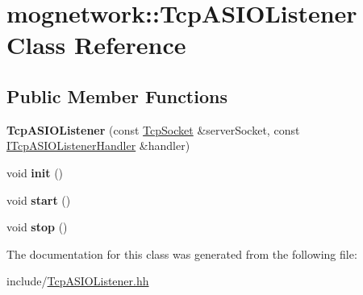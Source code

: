 \hypertarget{classmognetwork_1_1_tcp_a_s_i_o_listener}{\section{mognetwork\-:\-:Tcp\-A\-S\-I\-O\-Listener Class Reference}
\label{classmognetwork_1_1_tcp_a_s_i_o_listener}
}
\subsection*{Public Member Functions}
\begin{DoxyCompactItemize}
\item 
\hypertarget{classmognetwork_1_1_tcp_a_s_i_o_listener_a38db3f457487664499904641b214176c}{{\bfseries Tcp\-A\-S\-I\-O\-Listener} (const \hyperlink{classmognetwork_1_1_tcp_socket}{Tcp\-Socket} \&server\-Socket, const \hyperlink{classmognetwork_1_1_i_tcp_a_s_i_o_listener_handler}{I\-Tcp\-A\-S\-I\-O\-Listener\-Handler} \&handler)}\label{classmognetwork_1_1_tcp_a_s_i_o_listener_a38db3f457487664499904641b214176c}

\item 
\hypertarget{classmognetwork_1_1_tcp_a_s_i_o_listener_ab82a084f84968f7ac7ab17a0eb74211f}{void {\bfseries init} ()}\label{classmognetwork_1_1_tcp_a_s_i_o_listener_ab82a084f84968f7ac7ab17a0eb74211f}

\item 
\hypertarget{classmognetwork_1_1_tcp_a_s_i_o_listener_afd805699dfe27ceb0541feeefacc13dc}{void {\bfseries start} ()}\label{classmognetwork_1_1_tcp_a_s_i_o_listener_afd805699dfe27ceb0541feeefacc13dc}

\item 
\hypertarget{classmognetwork_1_1_tcp_a_s_i_o_listener_ac9952961dce0f44bc720485a4e4e620d}{void {\bfseries stop} ()}\label{classmognetwork_1_1_tcp_a_s_i_o_listener_ac9952961dce0f44bc720485a4e4e620d}

\end{DoxyCompactItemize}


The documentation for this class was generated from the following file\-:\begin{DoxyCompactItemize}
\item 
include/\hyperlink{_tcp_a_s_i_o_listener_8hh}{Tcp\-A\-S\-I\-O\-Listener.\-hh}\end{DoxyCompactItemize}
